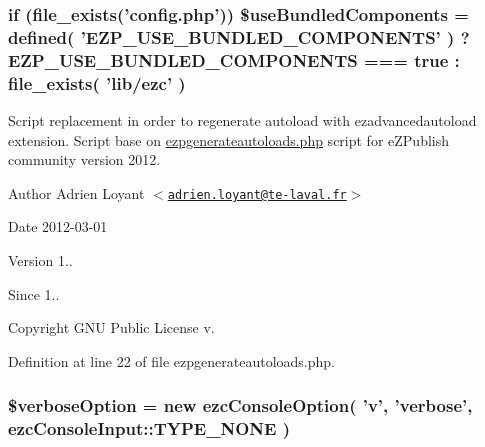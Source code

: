 \hypertarget{ezpgenerateautoloads_8php_abdb1c04b56bd870d8c95d438c1a3ceb7}{
\subsubsection[{\$use\-Bundled\-Components}]{\setlength{\rightskip}{0pt plus 5cm}if (file\-\_\-exists('config.\-php')) \$use\-Bundled\-Components = defined( '\-E\-Z\-P\-\_\-\-U\-S\-E\-\_\-\-B\-U\-N\-D\-L\-E\-D\-\_\-\-C\-O\-M\-P\-O\-N\-E\-N\-T\-S' ) ? \-E\-Z\-P\-\_\-\-U\-S\-E\-\_\-\-B\-U\-N\-D\-L\-E\-D\-\_\-\-C\-O\-M\-P\-O\-N\-E\-N\-T\-S === true \-: file\-\_\-exists( 'lib/ezc' )}}\label{ezpgenerateautoloads_8php_abdb1c04b56bd870d8c95d438c1a3ceb7}
\-Script replacement in order to regenerate autoload with ezadvancedautoload extension. \-Script base on \hyperlink{ezpgenerateautoloads_8php}{ezpgenerateautoloads.\-php} script for e\-Z\-Publish community version 2012.

\begin{DoxyAuthor}{\-Author}
\-Adrien \-Loyant $<$\href{mailto:adrien.loyant@te-laval.fr}{\tt adrien.\-loyant@te-\/laval.\-fr}$>$
\end{DoxyAuthor}
\begin{DoxyDate}{\-Date}
2012-\/03-\/01 
\end{DoxyDate}
\begin{DoxyVersion}{\-Version}
1.. 
\end{DoxyVersion}
\begin{DoxySince}{\-Since}
1.. 
\end{DoxySince}
\begin{DoxyCopyright}{\-Copyright}
\-G\-N\-U \-Public \-License v. 
\end{DoxyCopyright}


\-Definition at line 22 of file ezpgenerateautoloads.\-php.

\hypertarget{ezpgenerateautoloads_8php_a22133d0c8998aa2d18623686cca5faa4}{
\subsubsection[{\$verbose\-Option}]{\setlength{\rightskip}{0pt plus 5cm}\$verbose\-Option = new ezc\-Console\-Option( 'v', 'verbose', ezc\-Console\-Input\-::\-T\-Y\-P\-E\-\_\-\-N\-O\-N\-E )}}\label{ezpgenerateautoloads_8php_a22133d0c8998aa2d18623686cca5faa4}


